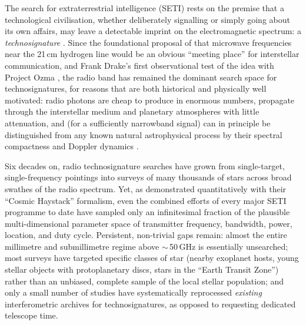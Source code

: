 \documentclass{openjournal}
\begin{document}
The search for extraterrestrial intelligence (SETI) rests on the premise that a
technological civilisation, whether deliberately signalling or simply going about
its own affairs, may leave a detectable imprint on the electromagnetic spectrum: a
\emph{technosignature} \citep{Sheikh2020,SETIreview2025}. Since the foundational
proposal of \citet{CocconiMorrison1959} that microwave frequencies near the 21\,cm
hydrogen line would be an obvious ``meeting place'' for interstellar communication,
and Frank Drake's first observational test of the idea with Project Ozma
\citep{Drake1960}, the radio band has remained the dominant search space for
technosignatures, for reasons that are both historical and physically well
motivated: radio photons are cheap to produce in enormous numbers, propagate
through the interstellar medium and planetary atmospheres with little attenuation,
and (for a sufficiently narrowband signal) can in principle be distinguished from
any known natural astrophysical process by their spectral compactness and Doppler
dynamics \citep{Sheikh2020}.

Six decades on, radio technosignature searches have grown from single-target,
single-frequency pointings into surveys of many thousands of stars across broad
swathes of the radio spectrum. Yet, as \citet{Wright2018} demonstrated
quantitatively with their ``Cosmic Haystack'' formalism, even the combined efforts
of every major SETI programme to date have sampled only an infinitesimal fraction
of the plausible multi-dimensional parameter space of transmitter frequency,
bandwidth, power, location, and duty cycle. Persistent, non-trivial gaps remain:
almost the entire millimetre and submillimetre regime above $\sim$\,50\,GHz is
essentially unsearched; most surveys have targeted specific classes of star
(nearby exoplanet hosts, young stellar objects with protoplanetary discs, stars in
the ``Earth Transit Zone'') rather than an unbiased, complete sample of the local
stellar population; and only a small number of studies have systematically
reprocessed \emph{existing} interferometric archives for technosignatures, as
opposed to requesting dedicated telescope time.
\end{document}
